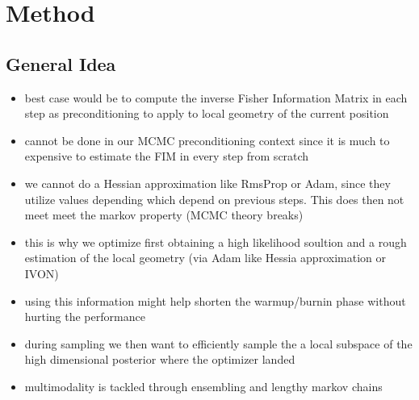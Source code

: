 \section{Method} \label{sec:method}
\subsection{General Idea} \label{sec:general_idea}

\begin{itemize}
    \item best case would be to compute the inverse Fisher Information Matrix in each step as preconditioning to apply to local geometry of the current position
    \item cannot be done in our MCMC preconditioning context since it is much to expensive to estimate the FIM in every step from scratch
    \item we cannot do a Hessian approximation like RmsProp or Adam, since they utilize values depending which depend on previous steps. This does then not meet meet the markov property (MCMC theory breaks)
    \item this is why we optimize first obtaining a high likelihood soultion and a rough estimation of the local geometry (via Adam like Hessia approximation or IVON)
    \item using this information might help shorten the warmup/burnin phase without hurting the performance
    \item during sampling we then want to efficiently sample the a local subspace of the high dimensional posterior where the optimizer landed
    \item multimodality is tackled through ensembling and lengthy markov chains
\end{itemize}
